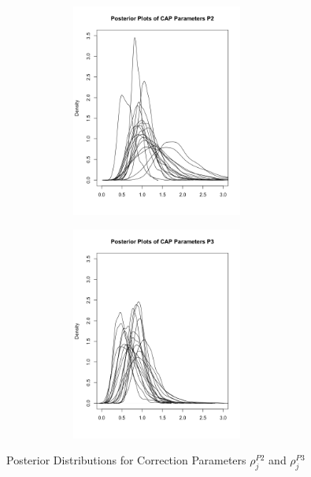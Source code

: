 \documentclass[12pt]{article}
\begin{document}
\begin{figure}[ht]
\centering
\begin{subfigure}{.5\textwidth}
  \centering
      \includegraphics[width=8cm, height=7cm]{CAP2}
\end{subfigure}%
\begin{subfigure}{.5\textwidth}
  \center
  	\includegraphics[width=8cm, height=7cm]{CAP3}
\end{subfigure}
\caption{Posterior Distributions for Correction Parameters $\rho_{j}^{P2}$ and $\rho_{j}^{P3}$}
\label{fig:CAP}
\end{figure}
\end{document}
